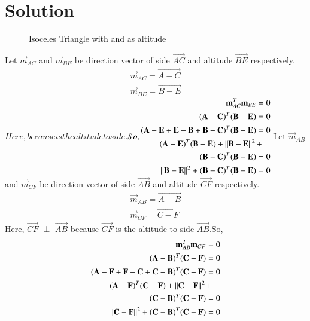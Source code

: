 \documentclass[journal,12pt,twocolumn]{IEEEtran}
\begin{document}
 \section{Solution}
 \renewcommand{\thefigure}{1}
 \begin{figure}[!h]
 \centering
 \resizebox{\columnwidth}{!}{}
 \caption{Isoceles Triangle with  and  as altitude}
 \label{myfig}
 \end{figure}
 Let $\vec{m}_{AC}$ and $\vec{m}_{BE}$ be direction vector of side $\vec{AC}$ and altitude $\vec{BE}$ respectively.
 \begin{align}
 \vec{m}_{AC}=\vec{A-C}\\
 \vec{m}_{BE}=\vec{B-E}
 \end{align}
$ Here, $$  $\perp$ $$ because $$ is the altitude to side $$.So,
 \begin{align}
 \vec{m}_{AC}^{T}\vec{m}_{BE}=0\\
 \vec{(A-C)}^T\vec{(B-E)}=0\label{2.0.4}\\
  \vec{(A-E+E-B+B-C)}^T\vec{(B-E)}=0\\
 \begin{multlined}
\vec{(A-E)}^T\vec{(B-E)}+\norm{\vec{B-E}}^2+\\ \vec{(B-C)}^T\vec{(B-E)}=0\end{multlined}\\
\norm{\vec{B-E}}^2+\vec{(B-C)}^T\vec{(B-E)}=0 \label{2}
\end{align}$
 Let $\vec{m}_{AB}$ and $\vec{m}_{CF}$ be direction vector of side $\vec{AB}$ and altitude $\vec{CF}$ respectively.
 \begin{align}
 \vec{m}_{AB}=\vec{A-B}\\
 \vec{m}_{CF}=\vec{C-F}
 \end{align}
 Here, $\vec{CF}$  $\perp$ $\vec{AB}$ because $\vec{CF}$ is the altitude to side $\vec{AB}$.So,
 \begin{align}
 \vec{m}_{AB}^T\vec{m}_{CF}=0\\
 \vec{(A-B)}^T\vec{(C-F)}=0\\
\vec{(A-F+F-C+C-B)}^T\vec{(C-F)}=0\\
\begin{multlined}
 \vec{(A-F)}^T\vec{(C-F)}+\norm{\vec{C-F}}^2+\\ \vec{(C-B)}^T\vec{(C-F)}=0\end{multlined}\\
\norm{\vec{C-F}}^2+\vec{(C-B)}^T\vec{(C-F)}=0\label{1}
 \end{align}
\end{document}
